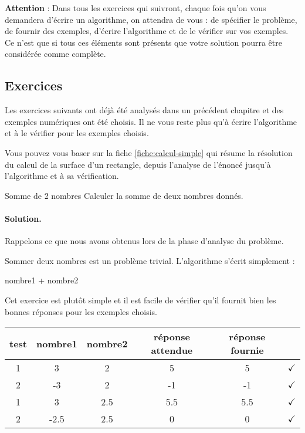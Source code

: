			\bigskip
			\textbf{Attention} : 
			Dans tous les exercices qui suivront,
			chaque fois qu'on vous demandera d'écrire un algorithme,
			on attendra de vous : de spécifier le problème,
			de fournir des exemples, d'écrire l'algorithme
			et de le vérifier sur vos exemples.
			Ce n'est que si tous ces éléments sont présents
			que votre solution pourra être considérée comme complète.

\clearpage
		\subsection{Exercices}\label{prem-ex-simple}

			Les exercices suivants ont déjà été analysés 
			dans un précédent chapitre
			et des exemples numériques ont été choisis.
			Il ne vous reste plus qu'à écrire l'algorithme
			et à le vérifier pour les exemples choisis.

			Vous pouvez vous baser sur la fiche \vref{fiche:calcul-simple} 
			qui résume la résolution 
			du calcul de la surface d'un rectangle,
			depuis l'analyse de l'énoncé jusqu'à l'algorithme
			et à sa vérification.
	
			\begin{Exercice}{Somme de 2 nombres}
				Calculer la somme de deux nombres donnés.
				\paragraph{Solution.}
				Rappelons ce que nous avons obtenus 
				lors de la phase d'analyse du problème.
				\begin{center}
				\end{center}
				Sommer deux nombres est un problème trivial.
				L'algorithme s'écrit simplement :			
				\begin{LDA}
						\Return nombre1 + nombre2
					\EndAlgo
				\end{LDA}
				Cet exercice est plutôt simple 
				et il est facile de vérifier qu'il fournit
				bien les bonnes réponses pour les exemples choisis.				
				\begin{center}
					\begin{tabular}{|c|cccc|c|}
					\hline
					test \no & nombre1 & nombre2 & réponse attendue & réponse fournie & {} \\\hline
					\hline 
					1 & 3    & 2   & 5   & 5   & {\color{ForestGreen}$\checkmark$} \\\hline
					2 & -3   & 2   & -1  & -1  & {\color{ForestGreen}$\checkmark$} \\\hline
					1 & 3    & 2.5 & 5.5 & 5.5 & {\color{ForestGreen}$\checkmark$} \\\hline
					2 & -2.5 & 2.5 & 0   & 0   & {\color{ForestGreen}$\checkmark$} \\\hline
					\end{tabular}
				\end{center}				
			\end{Exercice}
		
